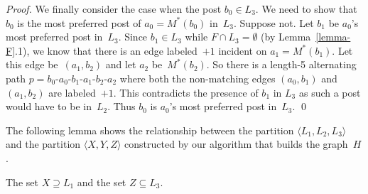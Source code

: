 \documentclass[11pt]{llncs}
\begin{document}
\begin{proof}
 We finally consider the case when the post $b_0 \in L_3$. 
We need to show that $b_0$ is the most preferred post of $a_0 = M^*(b_0)$ in~$L_3$. 
Suppose not. 
Let $b_1$ be $a_0$'s most preferred post in~$L_3$. Since $b_1 \in L_3$ while $F \cap L_3 = 
\emptyset$ (by Lemma~\ref{lemma-F}.1), we know that there is an 
edge labeled~$+1$ incident on $a_1 = M^*(b_1)$. Let this edge be~$(a_1,b_2)$ and let $a_2$ 
be~$M^*(b_2)$. So there is a length-5 alternating path $p = b_0$-$a_0$-$b_1$-$a_1$-$b_2$-$a_2$ 
where both the non-matching edges $(a_0,b_1)$ and $(a_1,b_2)$ are labeled~$+1$. This contradicts 
the presence of $b_1$ in $L_3$ as such a post would have to be in~$L_2$.
Thus $b_0$ is $a_0$'s most preferred post in~$L_3$. \qed
\end{proof}

The following lemma shows the relationship between the partition $\langle L_1,L_2,L_3\rangle$ and the partition $\langle X,Y,Z\rangle$ constructed by our algorithm that builds the graph~$H$.
\begin{lemma}
\label{lem:L1andX}
The set $X \supseteq L_1$ and the set $Z \subseteq L_3$.\end{lemma}
\end{document}
